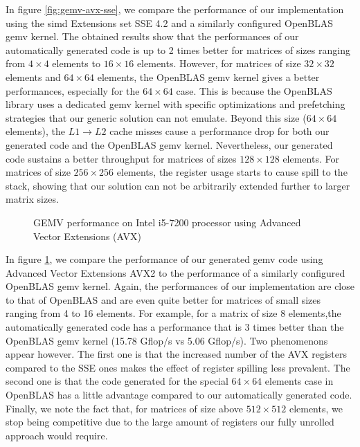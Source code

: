 \documentclass[../main]{subfiles}
\begin{document}
In figure \ref{fig:gemv-avx-sse}, we compare the performance
of our implementation using the \gls{simd} Extensions set SSE 4.2
and a similarly configured OpenBLAS \gls{gemv} kernel. The obtained results show
that the performances of our automatically generated code is
up to 2 times better for matrices of sizes ranging from $4 \times 4$
elements to $16 \times 16$ elements. However, for matrices of size
$32 \times 32$ elements and $64 \times 64$ elements, the OpenBLAS \gls{gemv}
kernel gives a better performances, especially for the $64 \times 64$
case. This is because the OpenBLAS library uses a dedicated
\gls{gemv} kernel with specific optimizations and prefetching
strategies that our generic solution can not emulate. Beyond
this size ($64 \times 64$ elements), the $L1 \rightarrow L2$ cache misses
cause a performance drop for both our generated code and
the OpenBLAS \gls{gemv} kernel. Nevertheless, our generated code
sustains a better throughput for matrices of sizes $128 \times 128$
elements. For matrices of size $256 \times 256$ elements, the register
usage starts to cause spill to the stack, showing that our
solution can not be arbitrarily extended further to larger matrix sizes.

\begin{figure}[h]
\fontsize{8}{10}\selectfont

\caption{
  GEMV performance on Intel i5-7200 processor using
  Advanced Vector Extensions (AVX)
}
\label{fig:gemv-avx-bench}
\end{figure}

In figure \ref{fig:gemv-avx-bench}, we compare the performance
of our generated \gls{gemv} code using Advanced Vector Extensions
AVX2 to the performance of a similarly configured OpenBLAS \gls{gemv} kernel.
Again, the performances of our implementation are close
to that of OpenBLAS and are even quite better for matrices of
small sizes ranging from 4 to 16 elements. For example, for a
matrix of size 8 elements,the automatically generated code has
a performance that is 3 times better than the OpenBLAS \gls{gemv}
kernel (15.78 Gflop/s vs 5.06 Gflop/s). Two phenomenons
appear however. The first one is that the increased number
of the AVX registers compared to the SSE ones makes the
effect of register spilling less prevalent. The second one is
that the code generated for the special $64 \times 64$ elements
case\cite{hpcs23} in OpenBLAS has a little advantage compared to
our automatically generated code. Finally, we note the fact
that, for matrices of size above $512 \times 512$ elements, we stop
being competitive due to the large amount of registers our
fully unrolled approach would require.
\end{document}
